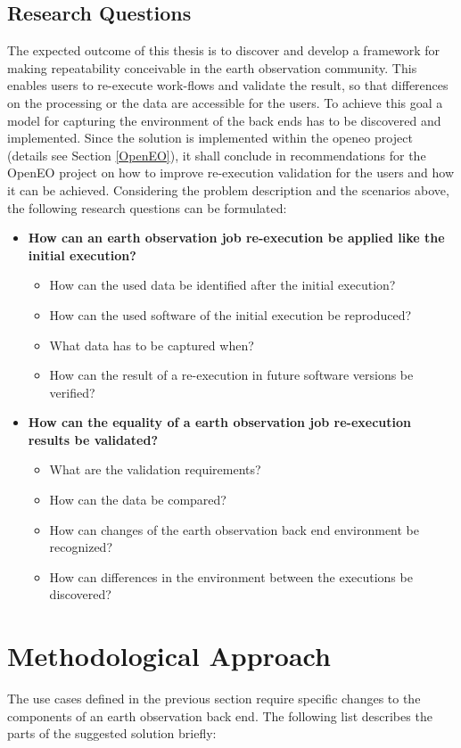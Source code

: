 \documentclass[draft,final]{vutinfth} %
\begin{document}
\subsection{Research Questions}\label{research question}

The expected outcome of this thesis is to discover and develop a framework for making repeatability conceivable in the earth observation community. This enables users to re-execute work-flows and validate the result, so that differences on the processing or the data are accessible for the users. To achieve this goal a model for capturing the environment of the back ends has to be discovered and implemented. Since the solution is implemented within the \gls{openeo} project (details see Section \ref{OpenEO}), it shall conclude in recommendations for the OpenEO project on how to improve re-execution validation for the users and how it can be achieved. Considering the problem description and the scenarios above, the following research questions can be formulated:

\begin{itemize}
	\item \textbf{How can an earth observation job re-execution be applied like the initial execution?}
	\begin{itemize}
		\item How can the used data be identified after the initial execution?
		\item How can the used software of the initial execution be reproduced?
		\item What data has to be captured when?
		\item How can the result of a re-execution in future software versions be verified?
	\end{itemize}
	\item \textbf{How can the equality of a earth observation job re-execution results be validated?}
	\begin{itemize}
		\item What are the validation requirements?
		\item How can the data be compared?
		\item How can changes of the earth observation back end environment be recognized?
		\item How can differences in the environment between the executions be discovered?
	\end{itemize}
\end{itemize}

\section{Methodological Approach}\label{Method}
The use cases defined in the previous section require specific changes to the components of an earth observation back end. The following list describes the parts of the suggested solution briefly: 
\end{document}
